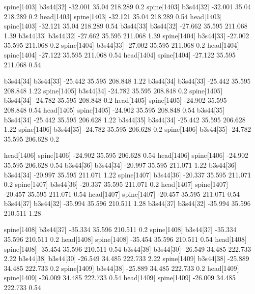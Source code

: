 spine[1403]    b3s44[32]    -32.001    35.04    218.289    0.2
spine[1403]    b3s44[32]    -32.001    35.04    218.289    0.2
head[1403]    spine[1403]    -32.121    35.04    218.289    0.54
head[1403]    spine[1403]    -32.121    35.04    218.289    0.54
b3s44[33]    b3s44[32]    -27.662    35.595    211.068    1.39
b3s44[33]    b3s44[32]    -27.662    35.595    211.068    1.39
spine[1404]    b3s44[33]    -27.002    35.595    211.068    0.2
spine[1404]    b3s44[33]    -27.002    35.595    211.068    0.2
head[1404]    spine[1404]    -27.122    35.595    211.068    0.54
head[1404]    spine[1404]    -27.122    35.595    211.068    0.54


b3s44[34]    b3s44[33]    -25.442    35.595    208.848    1.22
b3s44[34]    b3s44[33]    -25.442    35.595    208.848    1.22
spine[1405]    b3s44[34]    -24.782    35.595    208.848    0.2
spine[1405]    b3s44[34]    -24.782    35.595    208.848    0.2
head[1405]    spine[1405]    -24.902    35.595    208.848    0.54
head[1405]    spine[1405]    -24.902    35.595    208.848    0.54
b3s44[35]    b3s44[34]    -25.442    35.595    206.628    1.22
b3s44[35]    b3s44[34]    -25.442    35.595    206.628    1.22
spine[1406]    b3s44[35]    -24.782    35.595    206.628    0.2
spine[1406]    b3s44[35]    -24.782    35.595    206.628    0.2


head[1406]    spine[1406]    -24.902    35.595    206.628    0.54
head[1406]    spine[1406]    -24.902    35.595    206.628    0.54
b3s44[36]    b3s44[34]    -20.997    35.595    211.071    1.22
b3s44[36]    b3s44[34]    -20.997    35.595    211.071    1.22
spine[1407]    b3s44[36]    -20.337    35.595    211.071    0.2
spine[1407]    b3s44[36]    -20.337    35.595    211.071    0.2
head[1407]    spine[1407]    -20.457    35.595    211.071    0.54
head[1407]    spine[1407]    -20.457    35.595    211.071    0.54
b3s44[37]    b3s44[32]    -35.994    35.596    210.511    1.28
b3s44[37]    b3s44[32]    -35.994    35.596    210.511    1.28


spine[1408]    b3s44[37]    -35.334    35.596    210.511    0.2
spine[1408]    b3s44[37]    -35.334    35.596    210.511    0.2
head[1408]    spine[1408]    -35.454    35.596    210.511    0.54
head[1408]    spine[1408]    -35.454    35.596    210.511    0.54
b3s44[38]    b3s44[30]    -26.549    34.485    222.733    2.22
b3s44[38]    b3s44[30]    -26.549    34.485    222.733    2.22
spine[1409]    b3s44[38]    -25.889    34.485    222.733    0.2
spine[1409]    b3s44[38]    -25.889    34.485    222.733    0.2
head[1409]    spine[1409]    -26.009    34.485    222.733    0.54
head[1409]    spine[1409]    -26.009    34.485    222.733    0.54


